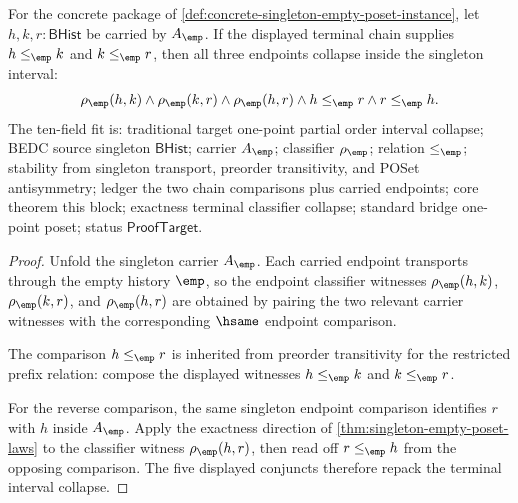 \begin{theorem}
\label{thm:poset-singleton-empty-terminal-interval-collapse}
For the concrete package of
\autoref{def:concrete-singleton-empty-poset-instance}, let
$h,k,r:\mathsf{BHist}$ be carried by $A_{\emp}$. If the displayed terminal
chain supplies $h\le_{\emp}k$ and $k\le_{\emp}r$, then all three endpoints
collapse inside the singleton interval:
$$
\rho_{\emp}(h,k)\land \rho_{\emp}(k,r)\land \rho_{\emp}(h,r)\land
h\le_{\emp}r\land r\le_{\emp}h.
$$
The ten-field fit is: traditional target one-point partial order interval
collapse; BEDC source singleton $\mathsf{BHist}$; carrier $A_{\emp}$;
classifier $\rho_{\emp}$; relation $\le_{\emp}$; stability from singleton
transport, preorder transitivity, and POSet antisymmetry; ledger the two chain
comparisons plus carried endpoints; core theorem this block; exactness
terminal classifier collapse; standard bridge one-point poset; status
$\mathsf{ProofTarget}$.
\end{theorem}
\begin{proof}
Unfold the singleton carrier $A_{\emp}$. Each carried endpoint transports
through the empty history $\emp$, so the endpoint classifier witnesses
$\rho_{\emp}(h,k)$, $\rho_{\emp}(k,r)$, and $\rho_{\emp}(h,r)$ are obtained by
pairing the two relevant carrier witnesses with the corresponding
$\hsame$ endpoint comparison.

The comparison $h\le_{\emp}r$ is inherited from preorder transitivity for the
restricted prefix relation: compose the displayed witnesses
$h\le_{\emp}k$ and $k\le_{\emp}r$.

For the reverse comparison, the same singleton endpoint comparison identifies
$r$ with $h$ inside $A_{\emp}$. Apply the exactness direction of
\autoref{thm:singleton-empty-poset-laws} to the classifier witness
$\rho_{\emp}(h,r)$, then read off $r\le_{\emp}h$ from the opposing comparison.
The five displayed conjuncts therefore repack the terminal interval collapse.
\end{proof}

